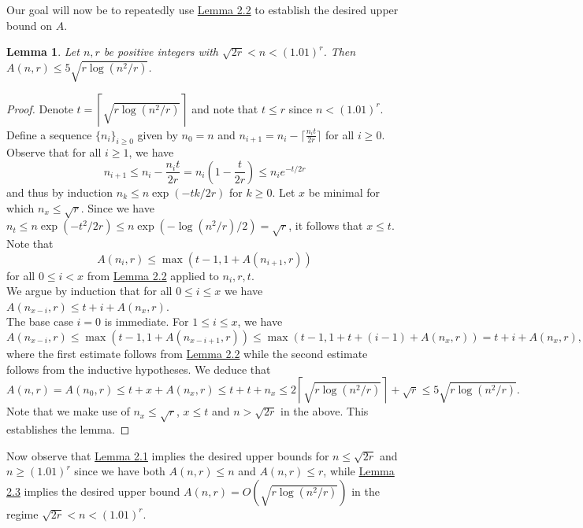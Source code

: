\documentclass[11pt,a4paper]{article}
\newtheorem{lemma}[theorem]{Lemma}
\begin{document}
\noindent
Our goal will now be to repeatedly use \hyperref[lem:2:2]{Lemma 2.2} to establish the desired upper bound on $A$.

\begin{lemma}
\label{lem:2:3}
    Let $n, r$ be positive integers with $\sqrt{2r} < n < (1.01)^r$. Then $A(n, r) \leq 5 \sqrt{r \log(n^2/r)}$.
\end{lemma}
\begin{proof}
Denote $t = \left\lceil \sqrt{r \log(n^2/r)} \right\rceil$ and note that $t \leq r$ since $n < (1.01)^r$. Define a sequence $\{n_i\}_{i \geq 0}$ given by $n_0 = n$ and $n_{i+1} = n_i - \lceil \frac{n_it}{2r} \rceil$ for all $i \geq 0$. Observe that for all $i \geq 1$, we have \[n_{i+1} \leq n_i - \frac{n_it}{2r}= n_i\left(1-\frac{t}{2r}\right) \leq n_i e^{-t/2r}\]
and thus by induction $n_k \leq n \exp(-tk/2r)$ for $k \geq 0$. Let $x$ be minimal for which $n_x \leq  \sqrt{r}$. Since we have $n_t \leq n \exp(-t^2/2r) \leq n \exp(-\log(n^2/r)/2) = \sqrt{r}$, it follows that $x \leq t$.\\

\noindent
Note that \[A(n_i, r) \leq \max(t-1, 1+A(n_{i+1}, r)) \] for all $0 \leq i < x$ from \hyperref[lem:2:2]{Lemma 2.2} applied to $n_i, r, t$.\\

\noindent
We argue by induction that for all $0 \leq i \leq x$ we have $A(n_{x-i}, r) \leq t+i+A(n_x, r)$. \\

\noindent
The base case $i =0$ is immediate. For $1 \leq i \leq x$, we have \[A(n_{x-i}, r) \le  \max(t-1, 1+A(n_{x-i+1}, r)) \leq \max(t-1, 1+t+(i-1) +A(n_x, r)) = t+i + A(n_x, r),\]
where the first estimate follows from \hyperref[lem:2:2]{Lemma 2.2} while the second estimate follows from the inductive hypotheses. We deduce that \[A(n, r) = A(n_0, r) \leq t+x+A(n_x, r) \leq t+t+n_x \leq 2 \left\lceil \sqrt{r \log(n^2/r)}\right \rceil + \sqrt{r} \leq 5\sqrt{r \log(n^2/r)}.\]
Note that we make use of $n_x \leq \sqrt{r}$, $x \leq t$ and $n > \sqrt{2r}$ in the above. This establishes the lemma.
\end{proof}
\noindent
Now observe that \hyperref[lem:2:1]{Lemma 2.1} implies the desired upper bounds for $n \leq \sqrt{2r}$ and $n \geq (1.01)^r$ since we have both $A(n, r) \leq n$ and $A(n, r) \leq r$, while \hyperref[lem:2:3]{Lemma 2.3} implies the desired upper bound $A(n, r) = O \left(\sqrt{r \log(n^2/r)}\right)$ in the regime $\sqrt{2r} < n < (1.01)^r.$ \\
\end{document}
